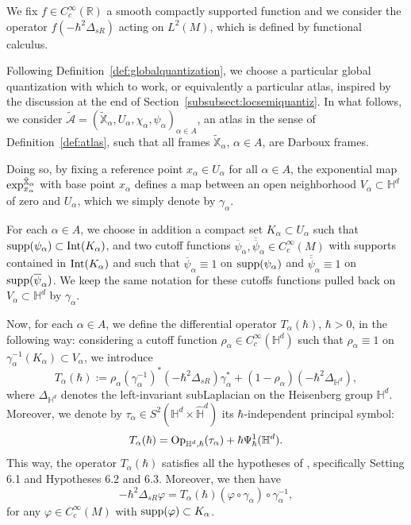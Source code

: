 \documentclass[12pt,a4paper]{amsart}
\theoremstyle{plain}
\theoremstyle{definition}
\theoremstyle{remark}
\numberwithin{equation}{section}
\theoremstyle{definition}
\def\R{{\mathbb R}}%
\def \Op{{\rm Op}}
\def \supp {{\rm supp}}
\def \exp{{\rm exp}}
\def \bX{\mathbb{X}}
\def \Heis{\mathbb{H}}
\def \Hhat{\widehat{\Heis}}
\numberwithin{equation}{section}
\begin{document}
\vspace{0.25cm}

We fix $f\in C_c^{\infty}(\R)$ a smooth compactly supported function and we consider the operator $f(-\hbar^2\Delta_{sR})$ acting on $L^2(M)$, which is defined by functional calculus.

Following Definition~\ref{def:globalquantization}, we choose a particular global quantization with which to work, or equivalently a particular atlas, inspired by the discussion at the end of Section~\ref{subsubsect:locsemiquantiz}. In what follows, we consider $\tilde{\mathcal{A}} = (\tilde{\bX}_\alpha,U_\alpha,\chi_\alpha,\psi_\alpha)_{\alpha\in A}$, an atlas in the sense of Definition~\ref{def:atlas}, such that all frames $\tilde{\bX}_\alpha$, $\alpha\in A$, are Darboux frames.

Doing so, by fixing a reference point $x_\alpha \in U_\alpha$ for all $\alpha\in A$, the exponential map $\exp_{x_\alpha}^{\tilde{\bX}_\alpha}$ with base point $x_\alpha$ defines a map between an open neighborhood $V_\alpha\subset \Heis^d$ of zero and $U_\alpha$, which we simply denote by $\gamma_\alpha$.

For each $\alpha\in A$, we choose in addition a compact set $K_\alpha \subset U_\alpha$ such that $\supp(\psi_\alpha)\subset {\rm Int}(K_\alpha)$, and two cutoff functions $\overline{\psi}_\alpha, \overline{\overline{\psi}}_\alpha \in C_c^\infty(M)$ with supports contained in ${\rm Int}(K_\alpha)$ and such that $\overline{\psi}_\alpha \equiv 1$ on $\supp(\psi_\alpha)$ and $\overline{\overline{\psi}}_\alpha \equiv 1$ on $\supp(\overline{\psi}_\alpha)$. We keep the same notation for these cutoffs functions pulled back on $V_\alpha \subset \Heis^d$ by $\gamma_\alpha$.

\vspace{0.25cm}

Now, for each $\alpha \in A$, we define the differential operator $T_\alpha(\hbar)$, $\hbar>0$, in the following way: considering a cutoff function $\rho_\alpha\in C_c^\infty(\Heis^d)$ such that $\rho_\alpha \equiv 1$ on $\gamma_\alpha^{-1}(K_\alpha) \subset V_\alpha$, we introduce
\begin{equation}
    \label{eq:locallaplacien}
    T_\alpha(\hbar) := \rho_\alpha (\gamma_\alpha^{-1})^* (-\hbar^2\Delta_{sR})\gamma_\alpha^* + (1-\rho_\alpha)(-\hbar^2\Delta_{\Heis^d}),
\end{equation}
where $\Delta_{\Heis^d}$ denotes the left-invariant subLaplacian on the Heisenberg group $\Heis^d$. Moreover, we denote by $\tau_\alpha \in S^2(\Heis^d\times\Hhat^d)$ its $\hbar$-independent principal symbol:
\begin{equation*}
    T_\alpha(\hbar) = \Op_{\Heis^d,\hbar}(\tau_\alpha) + \hbar \Psi_\hbar^1(\Heis^d).
\end{equation*}
This way, the operator $T_\alpha(\hbar)$ satisfies all the hypotheses of \cite{FM}, specifically Setting 6.1 and Hypotheses 6.2 and 6.3. Moreover, we then have
\begin{equation}
    \label{eq:localexpression}
    -\hbar^2\Delta_{sR}\varphi = T_\alpha(\hbar)(\varphi\circ\gamma_\alpha)\circ \gamma_\alpha^{-1},
\end{equation}
for any $\varphi\in C_c^\infty(M)$ with $\supp(\varphi)\subset K_\alpha$.
\end{document}
